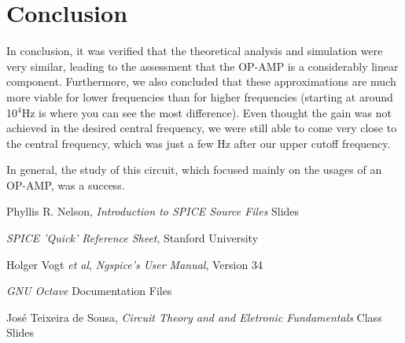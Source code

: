 \clearpage
\section{Conclusion}
\label{sec:conclusion}

In conclusion, it was verified that the theoretical analysis and simulation were very similar, leading to the assessment that the OP-AMP is a considerably linear component. Furthermore, we also concluded that these approximations are much more viable for lower frequencies than for higher frequencies (starting at around 10$^4$Hz is where you can see the most difference).
Even thought the gain was not achieved in the desired central frequency, we were still able to come very close to the central frequency, which was just a few Hz after our upper cutoff frequency.

In general, the study of this circuit, which focused mainly on the usages of an OP-AMP, was a success.

\begin{thebibliography}{}

Phyllis R. Nelson, \emph{Introduction to SPICE Source Files} Slides

\emph{SPICE 'Quick' Reference Sheet}, Stanford University

Holger Vogt \textit{et al}, \emph{Ngspice's User Manual}, Version 34

\emph{GNU Octave} Documentation Files 

José Teixeira de Sousa, \emph{Circuit Theory and and Eletronic Fundamentals} Class Slides

\end{thebibliography}

